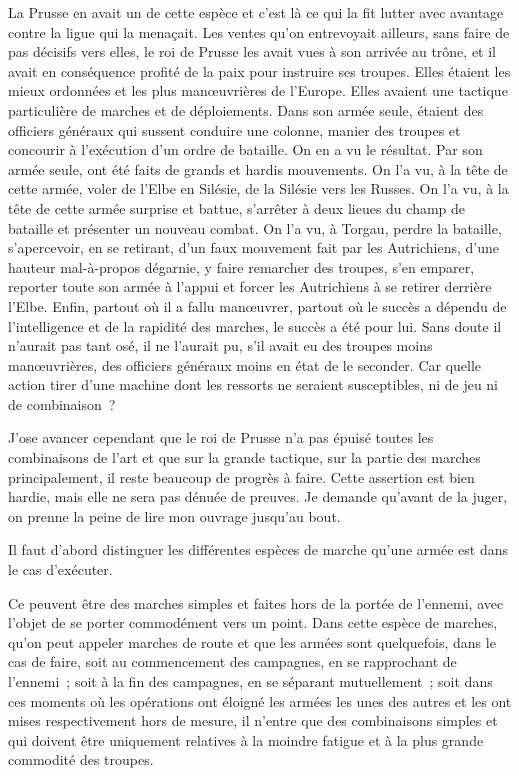 \documentclass[french,twoside]{book} %
\begin{document}
La Prusse en avait un de cette espèce et c’est là ce qui la fit lutter avec avantage contre la ligue qui la menaçait. Les ventes qu’on entrevoyait ailleurs, sans faire de pas décisifs vers elles, le roi de Prusse les avait vues à son arrivée au trône, et il avait en conséquence profité de la paix pour instruire ses troupes. Elles étaient les mieux ordonnées et les plus manœuvrières de l’Europe. Elles avaient une tactique particulière de marches et de déploiements. Dans son armée seule, étaient des officiers généraux qui sussent conduire une colonne, manier des troupes et concourir à l’exécution d’un ordre de bataille. On en a vu le résultat. Par son armée seule, ont été faits de grands et hardis mouvements. On l’a vu, à la tête de cette armée, voler de l’Elbe en Silésie, de la Silésie vers les Russes. On l’a vu, à la tête de cette armée surprise et battue, s’arrêter à deux lieues du champ de bataille et présenter un nouveau combat. On l’a vu, à Torgau, perdre la bataille, s’apercevoir, en se retirant, d’un faux mouvement fait par les Autrichiens, d’une hauteur mal-à-propos dégarnie, y faire remarcher des troupes, s’en emparer, reporter toute son armée à l’appui et forcer les Autrichiens à se retirer derrière l’Elbe. Enfin, partout où il a fallu manœuvrer, partout où le succès a dépendu de l’intelligence et de la rapidité des marches, le succès a été pour lui. Sans doute il n’aurait pas tant osé, il ne l’aurait pu, s’il avait eu des troupes moins manœuvrières, des officiers généraux moins en état de le seconder. Car quelle action tirer d’une machine dont les ressorts ne seraient susceptibles, ni de jeu ni de combinaison ?\par
J’ose avancer cependant que le roi de Prusse n’a pas épuisé toutes les combinaisons de l’art et que sur la grande tactique, sur la partie des marches principalement, il reste beaucoup de progrès à faire. Cette assertion est bien hardie, mais elle ne sera pas dénuée de preuves. Je demande qu’avant de la juger, on prenne la peine de lire mon ouvrage jusqu’au bout.\par
Il faut d’abord distinguer les différentes espèces de marche qu’une armée est dans le cas d’exécuter.\par
Ce peuvent être des marches simples et faites hors de la portée de l’ennemi, avec l’objet de se porter commodément vers un point. Dans cette espèce de marches, qu’on peut appeler marches de route et que les armées sont quelquefois, dans le cas de faire, soit au commencement des campagnes, en se rapprochant de l’ennemi ; soit à la fin des campagnes, en se séparant mutuellement ; soit dans ces moments où les opérations ont éloigné les armées les unes des autres et les ont mises respectivement hors de mesure, il n’entre que des combinaisons simples et qui doivent être uniquement relatives à la moindre fatigue et à la plus grande commodité des troupes.\par
\end{document}
